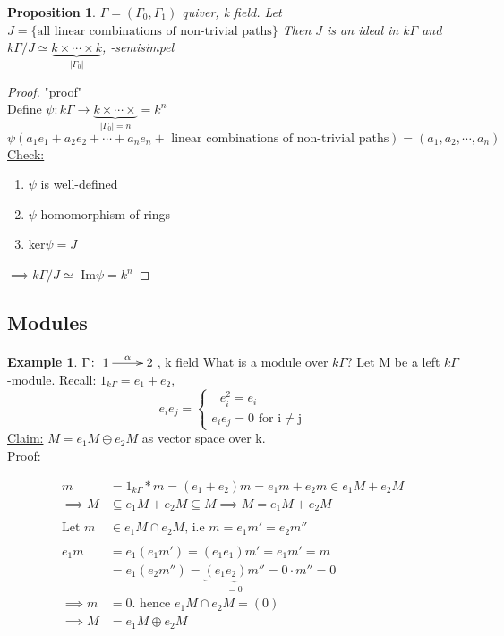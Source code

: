\documentclass{amsart}
\numberwithin{equation}{section}
\newtheorem{prop}[thm]{Proposition}
\theoremstyle{definition}
\newtheorem{exam}[thm]{Example}
\newcommand{\G}{\Gamma}
\begin{document}
\begin{prop}
	$\G=(\G_0,\G_1) $ quiver, k field. Let $J = \{\text{all linear combinations of non-trivial paths}\}$
	Then $J$ is an ideal in $k\G$ and $k\G/J \simeq \underbrace{k \times \cdots \times k}_{|\G_0|}$, -semisimpel
\end{prop}

\begin{proof}"proof"\\
	Define $\psi\colon k\G \rightarrow \underbrace{k \times \cdots \times}_{|\G_0|=n} = k^n $\\
	$\psi(a_1e_1 + a_2e_2 + \cdots + a_ne_n + \text{ linear combinations of non-trivial paths} ) = (a_1, a_2, \cdots, a_n)$\\\newline
	\underline{Check:} \begin{enumerate}
		\item  $\psi$ is well-defined
		\item $\psi$ homomorphism of rings
		\item ker$\psi=J$
	\end{enumerate}
	$\implies k\G/J \simeq$ Im$\psi=k^n$
\end{proof}

\subsection{Modules}
\begin{exam}
	$\Gamma\colon \xymatrix{1\ar[r]^\alpha & 2}$, k field
	What is a module over $k\G$? Let M be a left $k\G$-module.
	\underline{Recall:} 
	$1_{k\G}=e_1 + e_2$, \[e_ie_j=  
	\begin{cases}	\text{\ $e_i^2 = e_i$}\\
	\text{$e_ie_j = 0$ for i$\neq$j}
	\end{cases}\]
	\underline{Claim:} $M = e_1M\oplus e_2M$ as vector space over k.\\\newline
	\underline{Proof:}
	
	\begin{align*}
	m &= 1_{k\G}*m=(e_1 + e_2)m = e_1m+e_2m \in e_1M + e_2M\\
	\implies M &\subseteq e_1M + e_2M \subseteq M \implies M = e_1M + e_2M\\\\
	\text{Let } m&\in e_1M \cap e_2M \text{, i.e } m=e_1m'=e_2m''\\\\
	e_1m&=e_1(e_1m')=(e_1e_1)m'=e_1m'=m\\
	&= e_1(e_2m'')=\underbrace{(e_1e_2)m''}_{=0}=0\cdot m''=0\\
	\implies m &=0. \text{ hence } e_1M \cap e_2M = (0)\\
	\implies M &= e_1M \oplus e_2M\\ 
	\end{align*}
	
	
	
	
	
\end{exam}
\end{document}
